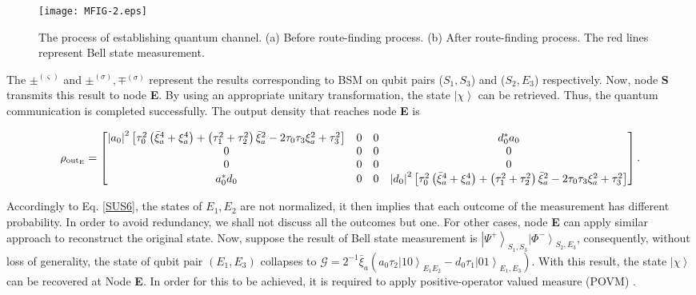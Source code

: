 \documentclass[aps,pra,twocolumn,showpacs,superscriptaddress,groupedaddress]{revtex4}
\begin{document}
\begin{figure*}[!t]
\centering \texttt{[image: MFIG-2.eps]}
\caption{\protect\small The process of establishing quantum channel. (a) Before route-finding process. (b) After route-finding process. The red lines represent Bell state measurement.}
\label{Mfig2}
\end{figure*}
The $\pm^{(\varsigma)}$ and $\pm^{(\sigma)},\mp^{(\sigma)}$ represent the results corresponding to BSM on qubit pairs ($S_1,S_3$) and ($S_2,E_3$) respectively. Now, node {\bf S} transmits this result to node {\bf E}. By using an appropriate unitary transformation, the state $\left|\chi\right\rangle$ can be retrieved. Thus, the quantum communication is completed successfully. The output density that reaches node {\bf E} is
\begin{widetext}
\begin{eqnarray}
\rho_{\rm out_E}=\left[\begin{matrix}\left|a_0\right|^2\left[\tau_0^2\left(\bar{\xi}_a^4+\xi_a^4\right)+\left(\tau_1^2+\tau_2^2\right)\bar{\xi}_a^2-2\tau_0\tau_3\xi_a^2+\tau_3^2\right]&0&0&d_0^*a_0\\
                                        0&0&0&0\\
                                        0&0&0&0\\
                                  a_0^*d_0&0&0&\left|d_0\right|^2\left[\tau_0^2\left(\bar{\xi}_a^4+\xi_a^4\right)+\left(\tau_1^2+\tau_2^2\right)\bar{\xi}_a^2-2\tau_0\tau_3\xi_a^2+\tau_3^2\right]
																	\label{SUS7}
\end{matrix}\right].\nonumber\\
\end{eqnarray}
\end{widetext}

Accordingly to Eq. \ref{SUS6}, the states of $E_1, E_2$ are not normalized, it then implies that each outcome of the measurement has different probability. In order to avoid redundancy, we shall not discuss all the outcomes but one. For other cases, node {\bf E} can apply similar approach to reconstruct the original state. Now, suppose the result of Bell state measurement is $\left|\Psi^{+}\right\rangle_{S_1,S_3}\left|\Phi^{-}\right\rangle_{S_2,E_3}$, consequently, without loss of generality, the state of qubit pair $(E_1,E_3)$ collapses to $\mathcal{G}=2^{-1}\bar{\xi}_a(a_0\tau_2\left|10\right\rangle_{E_1E_2}-d_0\tau_1\left|01\right\rangle_{E_1,E_3})$. With this result, the state $\left|\chi\right\rangle$ can be recovered at Node {\bf E}. In order for this to be achieved, it is required to apply positive-operator valued measure (POVM) \cite{MA9}.
\end{document}
